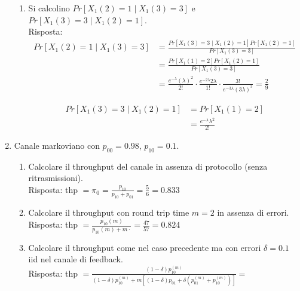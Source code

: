 \documentclass{article}
\begin{document}
\begin{enumerate}
\begin{enumerate}[label=\alph*)]
        \item Si calcolino $Pr[X_1(2)=1\mid X_1(3)=3]$ e $Pr[X_1(3)=3\mid X_1(2)=1]$.\\
        
        Risposta:
        \begin{align*}
        Pr[X_1(2)=1\mid X_1(3)=3] &= \frac{Pr[X_1(3)=3 \mid X_1(2)=1]Pr[X_1(2)=1]}{Pr[X_1(3)=3]}\\
        &= \frac{Pr[X_1(1)=2]Pr[X_1(2)=1]}{Pr[X_1(3)=3]}\\
        &= \frac{e^{-\lambda}(\lambda)^2}{2!} \cdot \frac{e^{-2\lambda}2\lambda}{1!} \cdot \frac{3!}{e^{-3\lambda}(3\lambda)^3} = \frac{2}{9}
        \end{align*}
        
        \begin{align*}
        Pr[X_1(3)=3\mid X_1(2)=1] &= Pr[X_1(1)=2]\\
        &= \frac{e^{-\lambda}\lambda^2}{2!}
        \end{align*}
    \end{enumerate}
    
    \item Canale markoviano con $p_{00} = 0.98$, $p_{10} = 0.1$.\begin{enumerate}[label=\alph*)]
        \item Calcolare il throughput del canale in assenza di protocollo (senza ritrasmissioni).\\
        
        Risposta: thp $= \pi_0 = \frac{p_{10}}{p_{10} + p_{01}} = \frac{5}{6} = 0.833$
        \item Calcolare il throughput con round trip time $m=2$ in assenza di errori.\\
        
        Risposta: thp $= \frac{p_{10}(m)}{p_{10}(m) + m\cdot} = \frac{47}{57} = 0.824$
        \item Calcolare il throughput come nel caso precedente ma con errori $\delta = 0.1$ iid nel canale di feedback.\\
        
        Risposta: thp $= \frac{(1-\delta)p_{10}^{(m)}}{(1-\delta)p_{10}^{(m)} + m \left[(1 - \delta)p_{01} + \delta \left( p_{01}^{(m)} + p_{10}^{(m)} \right)\right]} = $
    \end{enumerate}
\end{enumerate}

\newpage
\end{document}
